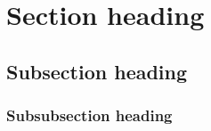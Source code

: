 \documentclass{article}
\begin{document}
\tableofcontents

\section{Section heading}
\subsection{Subsection heading}
\subsubsection{Subsubsection heading}
\end{document}
